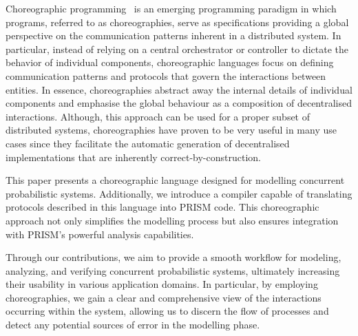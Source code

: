 Choreographic programming~\cite{M23} is an emerging programming
paradigm in which programs, referred to as choreographies, serve as
specifications providing a global perspective on the communication
patterns inherent in a distributed system. 
%
In particular, instead of relying on a central orchestrator or
controller to dictate the behavior of individual components,
choreographic languages focus on defining communication patterns and
protocols that govern the interactions between entities.
%
In essence, choreographies abstract away the internal details of
individual components and emphasise the global behaviour as a
composition of decentralised interactions. %
%
%
Although, this approach can be used for a proper subset of distributed
systems, choreographies have proven to be very useful in many use
cases since they facilitate the automatic generation of decentralised
implementations that are inherently correct-by-construction.
%

This paper presents a choreographic language designed for modelling
concurrent probabilistic systems.
Additionally, we introduce a compiler capable of translating protocols
described in this language into PRISM code. This choreographic
approach not only simplifies the modelling process but also ensures
integration with PRISM's powerful analysis capabilities. 

Through our contributions, we aim to provide a smooth workflow for
modeling, analyzing, and verifying concurrent probabilistic systems,
ultimately increasing their usability in various application domains.
%
In particular, by employing choreographies, we gain a clear and
comprehensive view of the interactions occurring within the system,
allowing us to discern the flow of processes and detect any potential
sources of error in the modelling phase.


